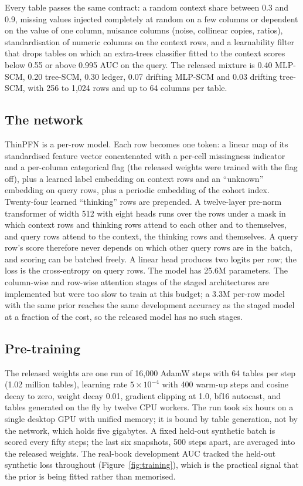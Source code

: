 \documentclass[twocolumn,10pt]{article}
\begin{document}
Every table passes the same contract: a random context share between 0.3 and 0.9, missing values injected completely
at random on a few columns or dependent on the value of one column, nuisance columns (noise, collinear copies, ratios),
standardisation of numeric columns on the context rows, and a learnability filter that drops tables on which an
extra-trees classifier fitted to the context scores below 0.55 or above 0.995 AUC on the query. The released mixture
is 0.40 MLP-SCM, 0.20 tree-SCM, 0.30 ledger, 0.07 drifting MLP-SCM and 0.03 drifting tree-SCM, with 256 to 1,024 rows
and up to 64 columns per table.

\subsection{The network}

ThinPFN is a per-row model. Each row becomes one token: a linear map of its standardised feature vector concatenated
with a per-cell missingness indicator and a per-column categorical flag (the released weights were trained with the
flag off), plus a learned label embedding on context rows and an ``unknown'' embedding on query rows, plus a periodic
embedding of the cohort index. Twenty-four learned ``thinking'' rows are prepended. A twelve-layer pre-norm transformer
of width 512 with eight heads runs over the rows under a mask in which context rows and thinking rows attend to each
other and to themselves, and query rows attend to the context, the thinking rows and themselves. A query row's score
therefore never depends on which other query rows are in the batch, and scoring can be batched freely. A linear head
produces two logits per row; the loss is the cross-entropy on query rows. The model has 25.6M parameters. The
column-wise and row-wise attention stages of the staged architectures \citep{qu2025tabicl} are implemented but were too
slow to train at this budget; a 3.3M per-row model with the same prior reaches the same development accuracy as the
staged model at a fraction of the cost, so the released model has no such stages.

\subsection{Pre-training}

The released weights are one run of 16,000 AdamW steps with 64 tables per step (1.02 million tables), learning rate
$5\times10^{-4}$ with 400 warm-up steps and cosine decay to zero, weight decay 0.01, gradient clipping at 1.0, bf16
autocast, and tables generated on the fly by twelve CPU workers. The run took six hours on a single desktop GPU with
unified memory; it is bound by table generation, not by the network, which holds five gigabytes. A fixed held-out
synthetic batch is scored every fifty steps; the last six snapshots, 500 steps apart, are averaged into the released
weights. The real-book development AUC tracked the held-out synthetic loss throughout (Figure~\ref{fig:training}),
which is the practical signal that the prior is being fitted rather than memorised.
\end{document}
